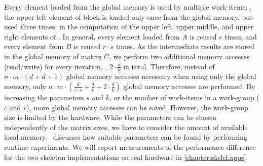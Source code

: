 Every element loaded from the global memory is used by multiple work-items:
\eg, the upper left element of block  is loaded only once from the global memory, but used three times:
in the computation of the upper left, upper middle, and upper right elements of .
In general, every element loaded from $A$ is reused $c$ times, and every element from $B$ is reused $r\cdot s$ times.
As the intermediate results are stored in the global memory of matrix $C$, we perform two additional memory accesses (read/write) for every iteration, \ie, $2\cdot \frac{d}{k}$ in total.
Therefore, instead of $n\cdot m\cdot (d + d + 1)$ global memory accesses necessary when using only the global memory, only $n\cdot m\cdot (\frac{d}{r\cdot s} + \frac{d}{c} + 2\cdot \frac{d}{k})$ global memory accesses are performed.
By increasing the parameters $s$ and $k$, or the number of work-items in a work-group ($c$ and $r$), more global memory accesses can be saved.
However, the work-group size is limited by the \GPU hardware.
While the parameters can be chosen independently of the matrix sizes, we have to consider the amount of available local memory.
\cite{SarjeAl2013}~discusses how suitable parameters can be found by performing runtime experiments.
We will report measurements of the performance difference for the two skeleton implementations on real hardware in \autoref{chapter:skelcl:apps}.



